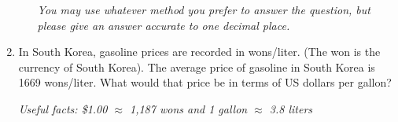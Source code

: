 \documentclass[12pt]{article}
\begin{document}
\begin{enumerate}
\begin{enumerate}
\emph{You may use whatever method you prefer to answer the question, but please give an answer accurate to one decimal place.}
\vfill

\end{enumerate}



\noindent \hrulefill
\item In South Korea, gasoline prices are recorded in wons/liter.  (The won is the currency of South Korea).  The average price of gasoline in South Korea is 1669 wons/liter.  What would that price be in terms of US dollars per gallon?

\emph{Useful facts:  \$1.00 $\approx$ 1,187 wons and 1 gallon $\approx$ 3.8 liters }\vfill


\end{enumerate}




\newpage
\end{document}
